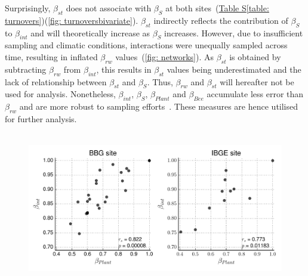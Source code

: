 \documentclass[11pt]{article}
\begin{document}
Surprisingly, $\beta_{st}$ does not associate with $\beta_{S}$ at both sites~(\hyperref[table: turnovers]{Table S\ref{table: turnovers}})(\autoref{fig: turnoversbivariate}). $\beta_{st}$ indirectly reflects the contribution of $\beta_{S}$ to $\beta_{int}$ and will theoretically increase as $\beta_{S}$ increases. However, due to insufficient sampling and climatic conditions, interactions were unequally sampled across time, resulting in inflated $\beta_{rw}$ values~(\autoref{fig: networks}). As $\beta_{st}$ is obtained by subtracting $\beta_{rw}$ from $\beta_{int}$, this results in $\beta_{st}$ values being underestimated and the lack of relationship between $\beta_{st}$ and $\beta_{S}$. Thus, $\beta_{rw}$ and $\beta_{st}$ will hereafter not be used for analysis. Nonetheless, $\beta_{int}$, $\beta_{S}$, $\beta_{Plant}$ and $\beta_{Bee}$ accumulate less error than $\beta_{rw}$ and are more robust to sampling efforts~\citep{Poisot2012}. These measures are hence utilised for further analysis. \\
\\

\begin{figure}[H]
  \centering
    \includegraphics[width=\textwidth]{plantturnover.pdf}
       \label{fig: plantturnover}
\end{figure} 
\end{document}
